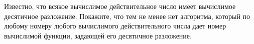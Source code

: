 Известно, что всякое вычислимое действительное число имеет вычислимое десятичное разложение. Покажите,
что тем не менее нет алгоритма, который по любому номеру любого вычислимого действительного числа дает
номер вычислимой функции, задающей его десятичное разложение.
